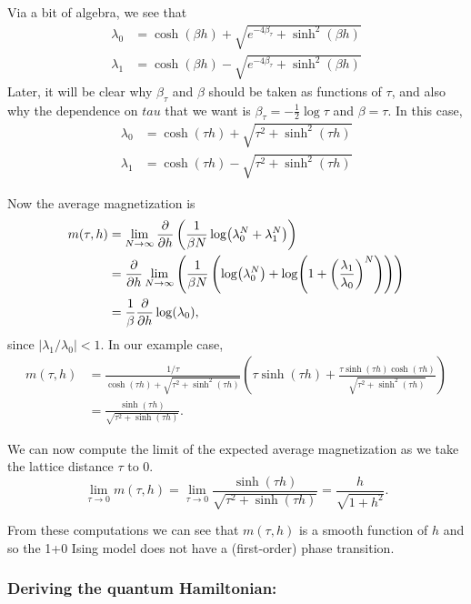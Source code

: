 \documentclass[11pt,reqno]{amsart}
\begin{document}
	Via a bit of algebra, we see that 
	\begin{align*}
		\lambda_0 &=\cosh(\beta h)+ \sqrt{e^{-4\beta_\tau} +\sinh^2(\beta h) } \\
		\lambda_1 &=\cosh(\beta h)- \sqrt{e^{-4\beta_\tau} +\sinh^2(\beta h) }
	\end{align*} 
	Later, it will be clear why $\beta_\tau$ and $\beta$ should be taken as functions of $\tau$, and
	also why the dependence on $tau$ that we want is $\beta_\tau=-\frac{1}{2}\log \tau$ and $\beta = \tau$.
	In this case,
	\begin{align*}
		\lambda_0 &=\cosh(\tau h)+ \sqrt{\tau^2 +\sinh^2(\tau h)} \\
		\lambda_1 &=\cosh(\tau h)- \sqrt{\tau^2 +\sinh^2(\tau h)}
	\end{align*}
	
	Now the average magnetization is
	\begin{align*}
		m(\tau, h)&=\lim_{N\to \infty}\frac{\partial}{\partial h}\left( \frac{1}{\beta N}\log(\lambda_0^N+\lambda_1^N) \right) \\
			&=\frac{\partial}{\partial h}\lim_{N\to \infty}\left( \frac{1}{\beta N}\left(\log(\lambda_0^N)+\log(1+\left(\frac{\lambda_1}{\lambda_0}\right)^N)\right) \right) \\
			&= \frac{1}{\beta}\frac{\partial}{\partial h} \log(\lambda_0),
	\end{align*}
	since $|\lambda_1/\lambda_0| <1.$
	In our example case,
	\begin{align*}
		m(\tau,h)&= \frac{1/\tau}{\cosh(\tau h)+ \sqrt{\tau^2 +\sinh^2(\tau h)}}\left( \tau \sinh(\tau h)+\frac{\tau \sinh(\tau h)\cosh(\tau h)}{\sqrt{\tau^2 +\sinh^2(\tau h)}} \right)\\
		&=\frac{\sinh(\tau h)}{\sqrt{\tau^2+\sinh(\tau h)}}.
	\end{align*}

	We can now compute the limit of the expected average magnetization as we take the lattice distance $\tau$ to 0.
		\[ \lim_{\tau \to 0} m(\tau,h) = \lim_{\tau \to 0} \frac{\sinh(\tau h)}{\sqrt{\tau^2+\sinh(\tau h)}} = \frac{h}{\sqrt{1+h^2}}. \]
		
	From these computations we can see that $m(\tau,h)$ is a smooth function of $h$ and so the 1+0 Ising model does not have a (first-order) phase transition.
	
	\subsubsection{Deriving the quantum Hamiltonian:}
	
\end{document}
